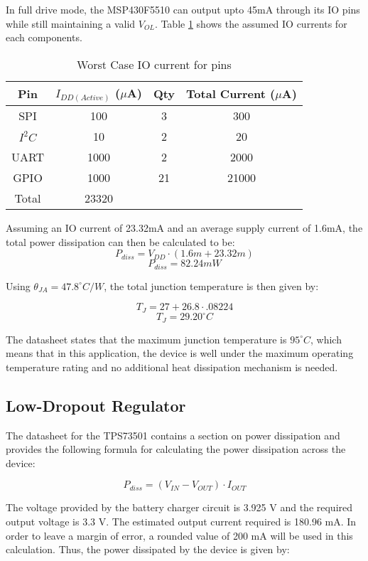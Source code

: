 In full drive mode, the MSP430F5510 can output upto 45mA through its IO pins while still maintaining a valid $V_{OL}$.    Table \ref{tab:ioCurrents} shows the assumed IO currents for each components.
\begin{table}[H]
  \centering
  \caption{Worst Case IO current for pins}
    \begin{tabular}{|c|c|c|c|}
     \hline
     \rowcolor{Gray}
    Pin & $I_{DD(Active)}$ ($\mu$A) & Qty & Total Current ($\mu$A)\\
     \hline \hline
    SPI & 100  & 3 & 300 \\ \hline
   	$I^2C$ & 10 & 2 & 20  \\ \hline
    UART & 1000 & 2 & 2000 \\ \hline
    GPIO  & 1000 & 21 & 21000\\ \hline \hline
    Total & 23320  \\ \hline     
    \end{tabular}%
  \label{tab:ioCurrents}%
\end{table}%
Assuming an IO current of 23.32mA and an average supply current of 1.6mA, the total power dissipation can then be calculated to be:
\[P_{diss} = V_{DD} \cdot \left(1.6m + 23.32m \right)\]
\[\boxed{P_{diss} = 82.24mW}\]

Using $\theta_{JA} = 47.8^\circ C/W$, the total junction temperature is then given by:

\[T_J = 27 + 26.8 \cdot .08224 \]
\[\boxed{T_J = 29.20 ^\circ C}\]

The datasheet states that the maximum junction temperature is $95^\circ C$, which means that in this application, the device is well under the maximum operating temperature rating and no additional heat dissipation mechanism is needed.


\subsection{Low-Dropout Regulator}
The datasheet for the TPS73501 contains a section on power dissipation and provides the following formula for calculating the power dissipation across the device:

\[P_{diss} = \left(V_{IN} - V_{OUT}\right)\cdot I_{OUT}\]

The voltage provided by the battery charger circuit is 3.925 V and the required output voltage is 3.3 V.  The estimated output current required is 180.96 mA.  In order to leave a margin of error, a rounded value of 200 mA will be used in this calculation.  Thus, the power dissipated by the device is given by:

